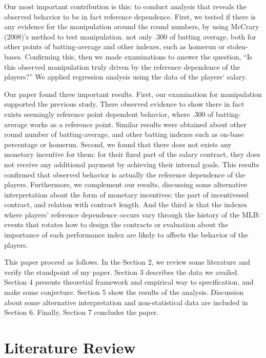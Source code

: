 \documentclass[dvipdfmx, 12pt]{article}
\begin{document}
Our most important contribution is this: to conduct analysis that reveals the observed behavior to be in fact reference dependence. First, we tested if there is any evidence for the manipulation around the round numbers, by using McCrary (2008)'s method to test manipulation. not only .300 of batting average, both for other points of batting-average and other indexes, such as homerun or stolen-bases. Confirming this, then we made examinations to answer the question, ``Is this observed manipulation truly driven by the reference dependence of the players?'' We applied regression analysis using the data of the players` salary.

Our paper found three important results. First, our examination for manipulation supported the previous study. There observed evidence to show there in fact exists seemingly reference point dependent behavior, where .300 of batting-average works as a reference point. Similar results were obtained about other round number of batting-average, and other batting indexes such as on-base percentage or homerun. Second, we found that there does not exists any monetary incentive for them: for their fixed part of the salary contract, they does not receive any additional payment by achieving their internal goals. This results confirmed that observed behavior is actually the reference dependence of the players. Furthermore, we complement our results, discussing some alternative interpretation about the form of monetary incentives: the part of incentivesed contract, and relation with contract length. And the third is that the indexes where players' reference dependence occurs vary through the history of the MLB: events that rotates how to design the contracts or evaluation about the importance of each performance index are likely to affects the behavior of the players.

This paper proceed as follows. In the Section 2, we review some literature and verify the standpoint of my paper. Section 3 describes the data we availed. Section 4 presents theoretial framework and empirical way to specification, and make some conjecture.  Section 5 show the results of the analysis. Discussion about some alternative interpretation and non-statistical data are included in Section 6. Finally, Section 7 concludes the paper.

\section{Literature Review}
\end{document}
